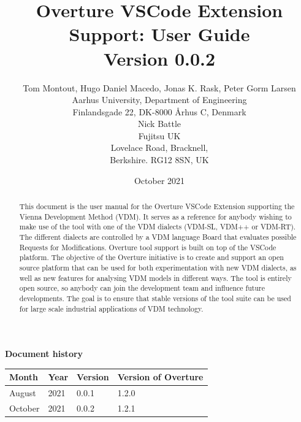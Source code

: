 \documentclass{overturerepchap}
\begin{document}
\title{Overture VSCode Extension Support: User Guide \\{\large Version 0.0.2}}
\author{Tom Montout, Hugo Daniel Macedo, Jonas K. Rask, Peter Gorm Larsen\\
Aarhus University, Department of Engineering\\
Finlandsgade 22, DK-8000 \AA{}rhus C, Denmark\\[3mm]
Nick Battle\\
Fujitsu UK\\
Lovelace Road, Bracknell, \\
Berkshire. RG12 8SN, UK}

\date{October 2021}


\maketitle


\textbf{Document history}

\begin{tabular}{|l|l|l|l|}\hline
Month   & Year & Version & Version of Overture\\ \hline
August & 2021 &     0.0.1    & 1.2.0 \\ \hline
October & 2021 & 0.0.2 & 1.2.1\\ \hline
\end{tabular}

\tableofcontents

\let\cleardoublepage\clearpage

\begin{abstract}
This document is the user manual for the Overture VSCode Extension supporting the Vienna Development Method
(VDM). It serves as a reference for anybody wishing to make use of
the tool with one of the VDM dialects (VDM-SL, VDM++ or VDM-RT). 
The different dialects are controlled by a VDM language Board that 
evaluates possible Requests for Modifications.
Overture tool support is built on top of the VSCode platform. The
objective of the Overture initiative is to create and support an open source
platform that can be used for both experimentation with new VDM dialects,
as well as new features for analysing VDM
models in different ways. The tool is entirely open source, so anybody
can join the development team and influence future
developments. The goal is to ensure that stable
versions of the tool suite can be used for large scale industrial
applications of VDM technology.
\end{abstract}
\end{document}
